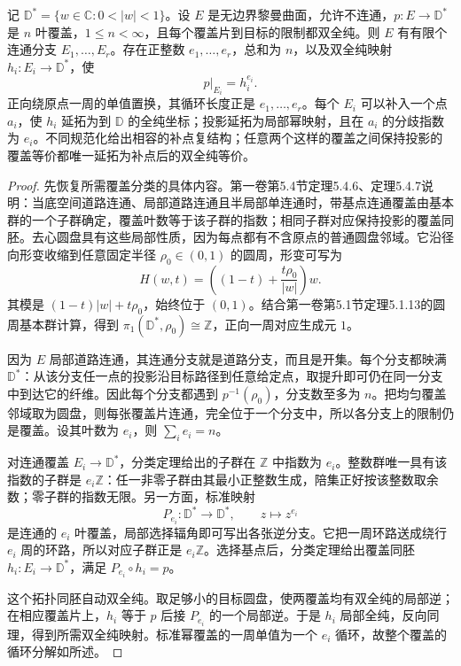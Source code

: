 \begin{lemma}\label{g4:lem:0202:punctured-disk-cover}
	记 \(\mathbb D^*=\{w\in\mathbb C:0<|w|<1\}\)。设 \(E\) 是无边界黎曼曲面，允许不连通，\(p:E\rightarrow\mathbb D^*\) 是 \(n\) 叶覆盖，\(1\leq n<\infty\)，且每个覆盖片到目标的限制都双全纯。则 \(E\) 有有限个连通分支 \(E_1,\ldots,E_r\)。存在正整数 \(e_1,\ldots,e_r\)，总和为 \(n\)，以及双全纯映射 \(h_i:E_i\rightarrow\mathbb D^*\)，使
	\[
		p|_{E_i}=h_i^{e_i}.
	\]
	正向绕原点一周的单值置换，其循环长度正是 \(e_1,\ldots,e_r\)。每个 \(E_i\) 可以补入一个点 \(a_i\)，使 \(h_i\) 延拓为到 \(\mathbb D\) 的全纯坐标；投影延拓为局部幂映射，且在 \(a_i\) 的分歧指数为 \(e_i\)。不同规范化给出相容的补点复结构；任意两个这样的覆盖之间保持投影的覆盖等价都唯一延拓为补点后的双全纯等价。
\end{lemma}
\begin{proof}
	先恢复所需覆盖分类的具体内容。第一卷第5.4节定理5.4.6、定理5.4.7说明：当底空间道路连通、局部道路连通且半局部单连通时，带基点连通覆盖由基本群的一个子群确定，覆盖叶数等于该子群的指数；相同子群对应保持投影的覆盖同胚。去心圆盘具有这些局部性质，因为每点都有不含原点的普通圆盘邻域。它沿径向形变收缩到任意固定半径 \(\rho_0\in(0,1)\) 的圆周，形变可写为
	\[
		H(w,t)=\left((1-t)+\frac{t\rho_0}{|w|}\right)w.
	\]
	其模是 \((1-t)|w|+t\rho_0\)，始终位于 \((0,1)\)。结合第一卷第5.1节定理5.1.13的圆周基本群计算，得到 \(\pi_1(\mathbb D^*,\rho_0)\cong\mathbb Z\)，正向一周对应生成元 \(1\)。

	因为 \(E\) 局部道路连通，其连通分支就是道路分支，而且是开集。每个分支都映满 \(\mathbb D^*\)：从该分支任一点的投影沿目标路径到任意给定点，取提升即可仍在同一分支中到达它的纤维。因此每个分支都遇到 \(p^{-1}(\rho_0)\)，分支数至多为 \(n\)。把均匀覆盖邻域取为圆盘，则每张覆盖片连通，完全位于一个分支中，所以各分支上的限制仍是覆盖。设其叶数为 \(e_i\)，则 \(\sum_i e_i=n\)。

	对连通覆盖 \(E_i\rightarrow\mathbb D^*\)，分类定理给出的子群在 \(\mathbb Z\) 中指数为 \(e_i\)。整数群唯一具有该指数的子群是 \(e_i\mathbb Z\)：任一非零子群由其最小正整数生成，陪集正好按该整数取余数；零子群的指数无限。另一方面，标准映射
	\[
		P_{e_i}:\mathbb D^*\longrightarrow\mathbb D^*,\qquad z\longmapsto z^{e_i}
	\]
	是连通的 \(e_i\) 叶覆盖，局部选择辐角即可写出各张逆分支。它把一周环路送成绕行 \(e_i\) 周的环路，所以对应子群正是 \(e_i\mathbb Z\)。选择基点后，分类定理给出覆盖同胚 \(h_i:E_i\rightarrow\mathbb D^*\)，满足 \(P_{e_i}\circ h_i=p\)。

	这个拓扑同胚自动双全纯。取足够小的目标圆盘，使两覆盖均有双全纯的局部逆；在相应覆盖片上，\(h_i\) 等于 \(p\) 后接 \(P_{e_i}\) 的一个局部逆。于是 \(h_i\) 局部全纯，反向同理，得到所需双全纯映射。标准幂覆盖的一周单值为一个 \(e_i\) 循环，故整个覆盖的循环分解如所述。


\end{proof}
